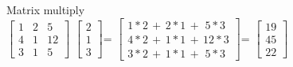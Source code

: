 \documentclass[12pt]{article}\usepackage{amsmath}
\begin{document}
Matrix multiply\\
$ \begin{bmatrix}
  1 & 2 & 5 \\
  4 & 1 & 12 \\
  3 & 1 & 5
 \end{bmatrix}$
 $ \begin{bmatrix}
   2 \\
   1 \\
   3
  \end{bmatrix}$=
$\begin{bmatrix}
1*2 \,+\, 2*1 \,+\,\,5*3 \\
4*2 \,+\, 1*1 \,+\,12*3 \\
3*2 \,+\, 1*1 \,+\,\, 5*3
\end{bmatrix}$=
$\begin{bmatrix}
 19 \\
 45 \\
 22
\end{bmatrix}$
\end{document}

